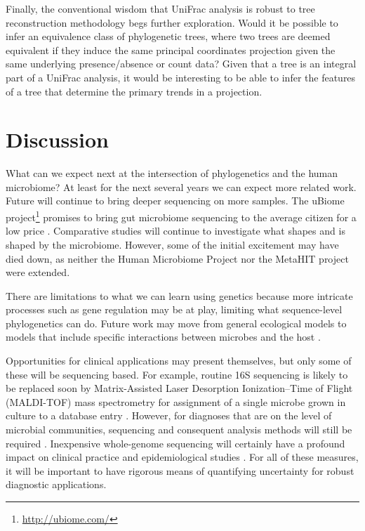 \documentclass{amsart}
\begin{document}
Finally, the conventional wisdom that UniFrac analysis is robust to tree reconstruction methodology begs further exploration.
Would it be possible to infer an equivalence class of phylogenetic trees, where two trees are deemed equivalent if they induce the same principal coordinates projection given the same underlying presence/absence or count data?
Given that a tree is an integral part of a UniFrac analysis, it would be interesting to be able to infer the features of a tree that determine the primary trends in a projection.


\section{Discussion}
What can we expect next at the intersection of phylogenetics and the human microbiome?
At least for the next several years we can expect more related work.
Future will continue to bring deeper sequencing on more samples.
The uBiome project\footnote{\url{http://ubiome.com/}} promises to bring gut microbiome sequencing to the average citizen for a low price \citep{costandi2013citizen}.
Comparative studies will continue to investigate what shapes and is shaped by the microbiome.
However, some of the initial excitement may have died down, as neither the Human Microbiome Project nor the MetaHIT project were extended.

There are limitations to what we can learn using genetics because more intricate processes such as gene regulation may be at play, limiting what sequence-level phylogenetics can do.
Future work may move from general ecological models to models that include specific interactions between microbes and the host \citep[reviewed in][]{hooper2012interactions}.

Opportunities for clinical applications may present themselves, but only some of these will be sequencing based.
For example, routine 16S sequencing is likely to be replaced soon by Matrix-Assisted Laser Desorption Ionization--Time of Flight (MALDI-TOF) mass spectrometry for assignment of a single microbe grown in culture to a database entry \citep{clark2013matrix}.
However, for diagnoses that are on the level of microbial communities, sequencing and consequent analysis methods will still be required \citep[reviewed in][]{Rogers2013271}.
Inexpensive whole-genome sequencing will certainly have a profound impact on clinical practice and epidemiological studies \citep{didelot2012transforming}.
For all of these measures, it will be important to have rigorous means of quantifying uncertainty for robust diagnostic applications.
\end{document}
